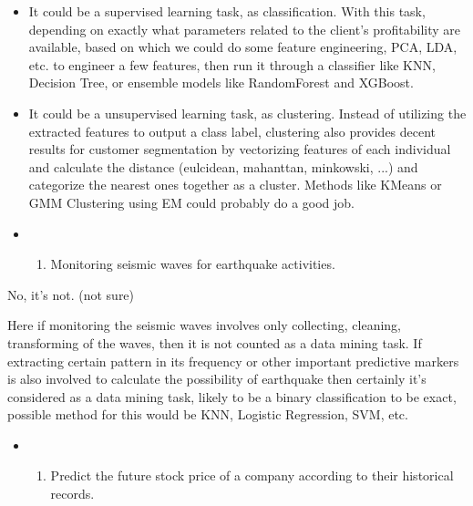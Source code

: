 \documentclass[11pt]{article}
\providecommand{\tightlist}{%
      \setlength{\itemsep}{0pt}\setlength{\parskip}{0pt}}
\begin{document}
\begin{itemize}
\item
  It could be a supervised learning task, as classification. With this
  task, depending on exactly what parameters related to the client's
  profitability are available, based on which we could do some feature
  engineering, PCA, LDA, etc. to engineer a few features, then run it
  through a classifier like KNN, Decision Tree, or ensemble models like
  RandomForest and XGBoost.
\item
  It could be a unsupervised learning task, as clustering. Instead of
  utilizing the extracted features to output a class label, clustering
  also provides decent results for customer segmentation by vectorizing
  features of each individual and calculate the distance (eulcidean,
  mahanttan, minkowski, ...) and categorize the nearest ones together as
  a cluster. Methods like KMeans or GMM Clustering using EM could
  probably do a good job.
\end{itemize}

    \begin{itemize}
\item
  \begin{enumerate}
  \def\labelenumi{\alph{enumi})}
  \setcounter{enumi}{2}
  \tightlist
  \item
    Monitoring seismic waves for earthquake activities.
  \end{enumerate}
\end{itemize}

    No, it's not. (not sure)

Here if monitoring the seismic waves involves only collecting, cleaning,
transforming of the waves, then it is not counted as a data mining task.
If extracting certain pattern in its frequency or other important
predictive markers is also involved to calculate the possibility of
earthquake then certainly it's considered as a data mining task, likely
to be a binary classification to be exact, possible method for this
would be KNN, Logistic Regression, SVM, etc.

    \begin{itemize}
\item
  \begin{enumerate}
  \def\labelenumi{\alph{enumi})}
  \setcounter{enumi}{3}
  \tightlist
  \item
    Predict the future stock price of a company according to their
    historical records.
  \end{enumerate}
\end{itemize}
\end{document}
